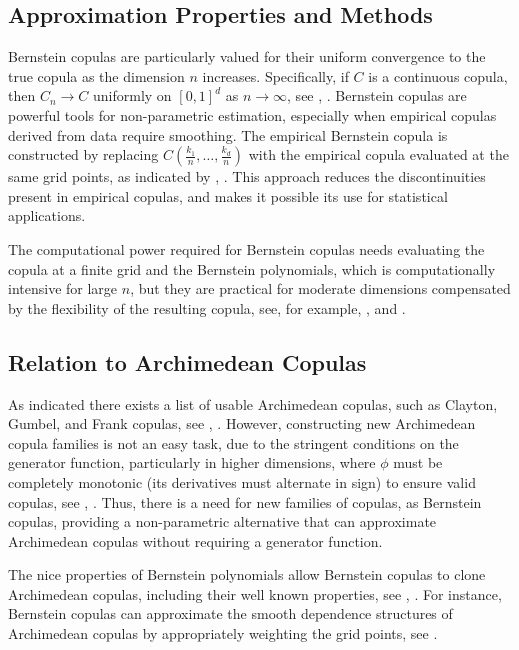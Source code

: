 \documentclass[
	11pt, %
	fleqn, %
	a4paper, %
]{LegrandOrangeBook}
\begin{document}
\subsection{Approximation Properties and Methods}
Bernstein copulas are particularly valued for their uniform convergence to the true copula as the dimension $n$ increases. Specifically, if $C$ is a continuous copula, then $C_n \to C$ uniformly on $[0,1]^d$ as $n \to \infty$, see \cite{Lorentz1986}, \cite{sancetta2004}. Bernstein copulas are powerful tools for non-parametric estimation, especially when empirical copulas derived from data require smoothing. The empirical Bernstein copula is constructed by replacing $C\left(\frac{k_1}{n},\ldots,\frac{k_d}{n}\right)$ with the empirical copula evaluated at the same grid points, as indicated by \cite{Durrleman2000}, \cite{Janssen2013}. This approach reduces the discontinuities present in empirical copulas, and makes it possible its use for statistical applications.

The computational power required for Bernstein copulas needs evaluating the copula at a finite grid and the Bernstein polynomials, which is computationally intensive for large $n$, but they are practical for moderate dimensions compensated by the flexibility of the resulting copula, see, for example, \cite{Durrleman2000}, \cite{Janssen2013} and \cite{sancetta2004}.

\subsection{Relation to Archimedean Copulas}
As indicated there exists a list of usable Archimedean copulas, such as Clayton, Gumbel, and Frank copulas, see \cite{Nelsen2006}, \cite{Joe2014}. However, constructing new Archimedean copula families is not an easy task, due to the stringent conditions on the generator function, particularly in higher dimensions, where $\phi$ must be completely monotonic (its derivatives must alternate in sign) to ensure valid copulas, see \cite{joe1997}, \cite{Joe2014}. Thus, there is a need for new families of copulas, as Bernstein copulas, providing a non-parametric alternative that can approximate Archimedean copulas without requiring a generator function.

The nice properties of Bernstein polynomials allow Bernstein copulas to clone Archimedean copulas, including their well known properties, see \cite{sancetta2004}, \cite{Durrleman2000}. For instance, Bernstein copulas can approximate the smooth dependence structures of Archimedean copulas by appropriately weighting the grid points, see \cite{Janssen2013}.
\end{document}
